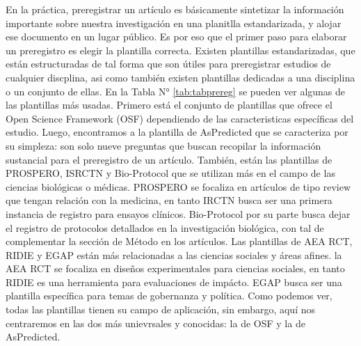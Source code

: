 \documentclass[
]{book}
\begin{document}
En la práctica, preregistrar un artículo es básicamente sintetizar la información importante sobre nuestra investigación en una planitlla estandarizada, y alojar ese documento en un lugar público. Es por eso que el primer paso para elaborar un preregistro es elegir la plantilla correcta. Existen plantillas estandarizadas, que están estructuradas de tal forma que son útiles para preregistrar estudios de cualquier discplina, asi como también existen plantillas dedicadas a una disciplina o un conjunto de ellas. En la Tabla N° \ref{tab:tabprereg} se pueden ver algunas de las plantillas más usadas. Primero está el conjunto de plantillas que ofrece el Open Science Framework (OSF) dependiendo de las caracteristicas específicas del estudio. Luego, encontramos a la plantilla de AsPredicted que se caracteriza por su simpleza: son solo nueve preguntas que buscan recopilar la información sustancial para el preregistro de un artículo. También, están las plantillas de PROSPERO, ISRCTN y Bio-Protocol que se utilizan más en el campo de las ciencias biológicas o médicas. PROSPERO se focaliza en artículos de tipo review que tengan relación con la medicina, en tanto IRCTN busca ser una primera instancia de registro para ensayos clínicos. Bio-Protocol por su parte busca dejar el registro de protocolos detallados en la investigación biológica, con tal de complementar la sección de Método en los artículos. Las plantillas de AEA RCT, RIDIE y EGAP están más relacionadas a las ciencias sociales y áreas afines. la AEA RCT se focaliza en diseños experimentales para ciencias sociales, en tanto RIDIE es una herramienta para evaluaciones de impácto. EGAP busca ser una plantilla específica para temas de gobernanza y política. Como podemos ver, todas las plantillas tienen su campo de aplicación, sin embargo, aquí nos centraremos en las dos más unievrsales y conocidas: la de OSF y la de AsPredicted.
\end{document}

